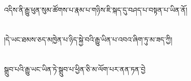 འདིས་ནི་རྒྱུ་ཕུན་སུམ་ཚོགས་པ་རྣམ་པ་གཉིས་ཇི་སྐད་དུ་བཤད་པ་བསྟན་པ་ཡིན་ནོ།\chapter{ }།དེ་ཡང་ཐམས་ཅད་མཁྱེན་པ་ཉིད་སྐྱེ་བའི་རྒྱུ་ཡིན་པ་འབའ་ཞིག་ཏུ་མ་ཟད་ཀྱི།\chapter{ }སྒྲུབ་པའི་རྒྱུ་ཡང་ཡིན་ཏེ་སྒྲུབ་པ་ཕྱིན་ཅི་མ་ལོག་པར་ནན་ཏན་བྱེ
